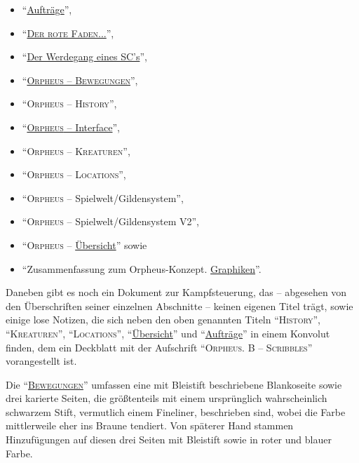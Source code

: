 \documentclass[a5paper,pagesize,numbers=noenddot]{scrbook}
\begin{document}
\begin{itemize}
   \item \enquote{\uline{Aufträge}},\autocite[S.~16--17]{orpheus_b_scribbles}
   \item \enquote{\uline{\textsc{Der rote Faden...}}},\autocite{orpheus_der_rote}
   \item \enquote{\uline{Der Werdegang eines SC's}},\autocite{orpheus_der_werdegang}
   \item \enquote{\uline{\textsc{Orpheus -- Bewegungen}}},\autocite{orpheus_bewegungen}
   \item \enquote{\textsc{Orpheus -- History}},\autocite[S.~2--3]{orpheus_b_scribbles}
   \item \enquote{\uline{\textsc{Orpheus} -- Interface}},\autocite{orpheus_interface}
   \item \enquote{\textsc{Orpheus -- Kreaturen}},\autocite[S.~4]{orpheus_b_scribbles}
   \item \enquote{\textsc{Orpheus -- Locations}},\autocite[S.~5]{orpheus_b_scribbles}
   \item \enquote{\textsc{Orpheus} -- Spielwelt/Gildensystem},\autocite{orpheus_gildensystem}
   \item \enquote{\textsc{Orpheus} -- Spielwelt/Gildensystem V2},\autocite{orpheus_gildensystem_v2}
   \item \enquote{\textsc{Orpheus} -- \uline{Übersicht}}\autocite[S.~11--14]{orpheus_b_scribbles} sowie
   \item \enquote{Zusammenfassung zum Orpheus-Konzept. \uline{Graphiken}}.\autocite{orpheus_zusammenfassung_1996}
\end{itemize}

\noindent Daneben gibt es noch ein Dokument zur Kampfsteuerung,\autocite{orpheus_kampfsteuerung} das -- abgesehen von den Überschriften seiner einzelnen Abschnitte -- keinen eigenen Titel trägt, sowie einige lose Notizen, die sich neben den oben genannten Titeln \enquote{\textsc{History}}, \enquote{\textsc{Kreaturen}}, \enquote{\textsc{Locations}}, \enquote{\uline{Übersicht}} und \enquote{\uline{Aufträge}} in einem Konvolut finden, dem ein Deckblatt mit der Aufschrift \enquote{\textsc{Orpheus. B -- Scribbles}} vorangestellt ist.\autocite{orpheus_b_scribbles}%

Die \enquote{\uline{\textsc{Bewegungen}}} umfassen eine mit Bleistift beschriebene Blankoseite sowie drei karierte Seiten, die größtenteils mit einem ursprünglich wahrscheinlich schwarzem Stift, vermutlich einem Fineliner, beschrieben sind, wobei die Farbe mittlerweile eher ins Braune tendiert.
Von späterer Hand stammen Hinzufügungen auf diesen drei Seiten mit Bleistift sowie in roter und blauer Farbe.
\end{document}
